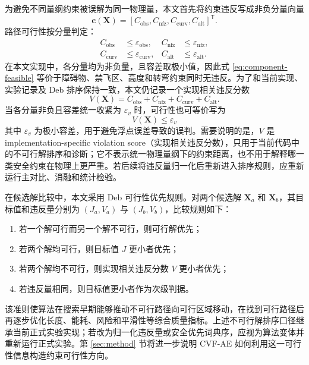 为避免不同量纲约束被误解为同一物理量，本文首先将约束违反写成非负分量向量
\begin{equation}
    \mathbf c(\mathbf X)=
    \left[
    C_{\mathrm{obs}},
    C_{\mathrm{nfz}},
    C_{\mathrm{curv}},
    C_{\mathrm{alt}}
    \right]^\mathsf T .
    \label{eq:constraint-vector}
\end{equation}
路径可行性按分量判定：
\begin{equation}
    \begin{aligned}
    C_{\mathrm{obs}}&\leq \varepsilon_{\mathrm{obs}},&
    C_{\mathrm{nfz}}&\leq \varepsilon_{\mathrm{nfz}},\\
    C_{\mathrm{curv}}&\leq \varepsilon_{\mathrm{curv}},&
    C_{\mathrm{alt}}&\leq \varepsilon_{\mathrm{alt}}.
    \end{aligned}
    \label{eq:component-feasible}
\end{equation}
在本文实现中，各分量均为非负量，且容差取极小值，因此式 \eqref{eq:component-feasible} 等价于障碍物、禁飞区、高度和转弯约束同时无违反。为了和当前实现、实验记录及 Deb 排序保持一致，本文仍记录一个实现相关违反分数
\begin{equation}
    V(\mathbf{X}) =
    C_{\mathrm{obs}} + C_{\mathrm{nfz}} + C_{\mathrm{curv}} + C_{\mathrm{alt}}.
    \label{eq:total-violation}
\end{equation}
当各分量非负且容差统一收紧为 $\varepsilon_v$ 时，可行性也可等价写为
\begin{equation}
    V(\mathbf{X}) \leq \varepsilon_v
    \label{eq:feasible-condition}
\end{equation}
其中 $\varepsilon_v$ 为极小容差，用于避免浮点误差导致的误判。需要说明的是，$V$ 是 implementation-specific violation score（实现相关违反分数），只用于当前代码中的不可行解排序和诊断；它不表示统一物理量纲下的约束距离，也不用于解释哪一类安全约束在物理上更严重。若后续将违反量归一化后重新进入排序规则，应重新运行主对比、消融和统计检验。

在候选解比较中，本文采用 Deb 可行性优先规则。对两个候选解 $\mathbf{X}_a$ 和 $\mathbf{X}_b$，其目标值和违反量分别为 $(J_a,V_a)$ 与 $(J_b,V_b)$，比较规则如下：
\begin{enumerate}
    \item 若一个解可行而另一个解不可行，则可行解优先；
    \item 若两个解均可行，则目标值 $J$ 更小者优先；
    \item 若两个解均不可行，则实现相关违反分数 $V$ 更小者优先；
    \item 若违反量相同，则目标值更小者作为次级判据。
\end{enumerate}
该准则使算法在搜索早期能够推动不可行路径向可行区域移动，在找到可行路径后再逐步优化长度、能耗、风险和平滑性等综合质量指标。上述不可行解排序口径继承当前正式实验实现；若改为归一化违反量或安全优先词典序，应视为算法变体并重新运行正式实验。第 \ref{sec:method} 节将进一步说明 CVF-AE 如何利用这一可行性信息构造约束可行性方向。
